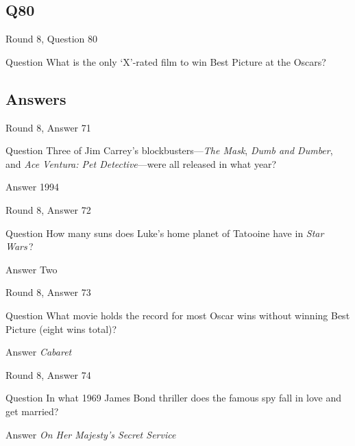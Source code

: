\documentclass[11pt]{beamer}
\begin{document}
\subsection*{Q80}
\begin{frame}[t]{Round 8, Question 80}
\vspace{2em}
\begin{block}{Question}
What is the only `X'-rated film to win Best Picture at the Oscars?
\end{block}
\end{frame}
    
\subsection{Answers}

\begin{frame}[t]{Round 8, Answer 71}
\vspace{2em}
\begin{block}{Question}
Three of Jim Carrey's blockbusters—\emph{The Mask}, \emph{Dumb and Dumber}, and \emph{Ace Ventura: Pet Detective}—were all released in what year?
\end{block}
\pause{}
\begin{block}{Answer}
1994
\end{block}
\end{frame}
    

\begin{frame}[t]{Round 8, Answer 72}
\vspace{2em}
\begin{block}{Question}
How many suns does Luke's home planet of Tatooine have in \emph{Star Wars}\,?
\end{block}
\pause{}
\begin{block}{Answer}
Two
\end{block}
\end{frame}
    

\begin{frame}[t]{Round 8, Answer 73}
\vspace{2em}
\begin{block}{Question}
What movie holds the record for most Oscar wins without winning Best Picture (eight wins total)?
\end{block}
\pause{}
\begin{block}{Answer}
\emph{Cabaret}
\end{block}
\end{frame}
    

\begin{frame}[t]{Round 8, Answer 74}
\vspace{2em}
\begin{block}{Question}
In what 1969 James Bond thriller does the famous spy fall in love and get married?
\end{block}
\pause{}
\begin{block}{Answer}
\emph{On Her Majesty's Secret Service}
\end{block}
\end{frame}
    
\end{document}
